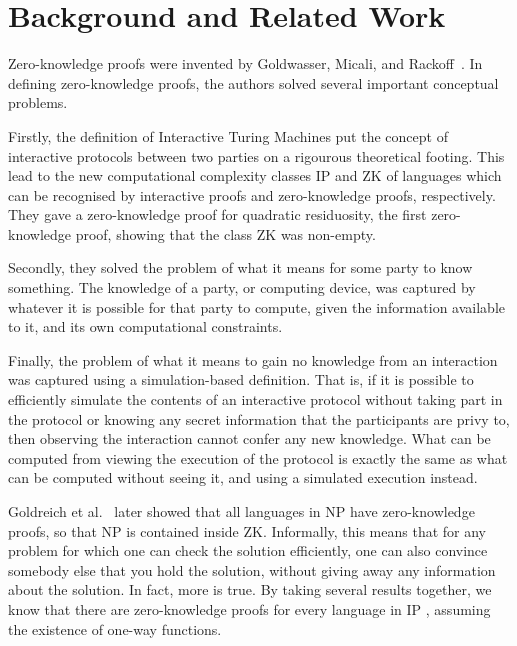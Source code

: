 \chapter{Background and Related Work}
\label{chapterlabel:RelatedWork}

Zero-knowledge proofs were invented by Goldwasser, Micali, and Rackoff~\cite{GoldwasserMR85}. In defining zero-knowledge proofs, the authors solved several important conceptual problems.

Firstly, the definition of Interactive Turing Machines put the concept of interactive protocols between two parties on a rigourous theoretical footing. This lead to the new computational complexity classes \textsf{IP} and \textsf{ZK} of languages which can be recognised by interactive proofs and zero-knowledge proofs, respectively. They gave a zero-knowledge proof for quadratic residuosity, the first zero-knowledge proof, showing that the class \textsf{ZK} was non-empty.

Secondly, they solved the problem of what it means for some party to know something. The knowledge of a party, or computing device, was captured by whatever it is possible for that party to compute, given the information available to it, and its own computational constraints.

Finally, the problem of what it means to gain no knowledge from an interaction was captured using a simulation-based definition. That is, if it is possible to efficiently simulate the contents of an interactive protocol without taking part in the protocol or knowing any secret information that the participants are privy to, then observing the interaction cannot confer any new knowledge. What can be computed from viewing the execution of the protocol is exactly the same as what can be computed without seeing it, and using a simulated execution instead.

Goldreich et al.~\cite{GMWzk} later showed that all languages in \textsf{NP} have zero-knowledge proofs, so that \textsf{NP} is contained inside \textsf{ZK}. Informally, this means that for any problem for which one can check the solution efficiently, one can also convince somebody else that you hold the solution, without giving away any information about the solution. In fact, more is true. By taking several results together, we know that there are zero-knowledge proofs for every language in \textsf{IP} \cite{GoldreichMW86,ImpagliazzoY87,Shamir90}, assuming the existence of one-way functions.


